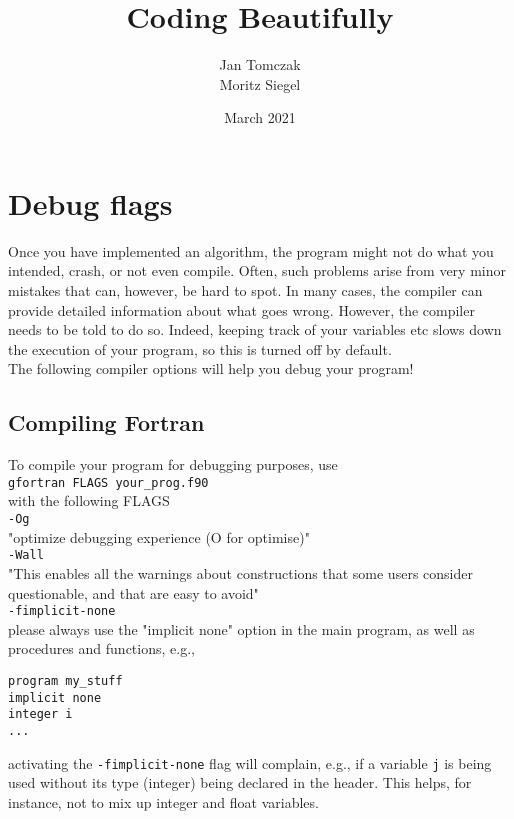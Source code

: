 \documentclass{article}
\title{Coding Beautifully}
\date{March 2021}
\author{Jan Tomczak\\Moritz Siegel}
\begin{document}
\maketitle

\section{Debug flags}

Once you have implemented an algorithm, the program might not do what you intended, crash, or not even compile.
Often, such problems arise from very minor mistakes that can, however, be hard to spot.
In many cases, the compiler can provide detailed information about what goes wrong. 
However, the compiler needs to be told to do so. Indeed, keeping track of your variables etc slows down the execution of your program, so this is turned off by default.\\

\noindent
The following compiler options will help you debug your program!

\subsection{Compiling Fortran}

To compile your program for debugging purposes, use\\

\verb|gfortran FLAGS your_prog.f90|\\

\noindent
with the following FLAGS\\

\verb|-Og|\\   
"optimize debugging experience (O for optimise)" \\

\verb|-Wall|\\  
"This enables all the warnings about constructions that some users consider questionable, and that are easy to avoid"\\

\verb|-fimplicit-none|\\
please always use the "implicit none" option in the main program, as well as procedures and functions, e.g.,


\begin{verbatim}
program my_stuff
implicit none
integer i
...
\end{verbatim}

\noindent
activating the \verb|-fimplicit-none| flag will complain, e.g., if a variable \verb|j| is being used without
its type (integer) being declared in the header. This helps, for instance, not to mix up integer and float variables.\\
\end{document}
